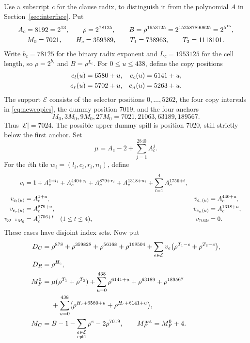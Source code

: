Use a subscript $c$ for the clause radix, to distinguish it from the
polynomial $A$ in Section~\ref{sec:interface}.  Put
\begin{gather}
 A_c=8192=2^{13},\qquad \rho=2^{78125},\qquad
 B=\rho^{1953125}=2^{152587890625}=2^{5^{16}},\label{eq:newbase}\\
 M_0=7021,\qquad H_c=359389,\qquad
 T_1=738963,\qquad T_2=1118101.\notag
\end{gather}
Write $b_c=78125$ for the binary radix exponent and $L_c=1953125$
for the cell length, so $\rho=2^{b_c}$ and $B=\rho^{L_c}$.
For $0\le u\le438$, define the copy positions
\begin{align}
 e_l(u)&=6580+u,& e_c(u)&=6141+u,\notag\\
 e_r(u)&=5702+u,& e_n(u)&=5263+u.\label{eq:newcopies}
\end{align}
The support $\mathcal E$ consists of the selector positions
$0,\ldots,5262$, the four copy intervals in \eqref{eq:newcopies}, the
dummy position 7019, and the four anchors
\[
 M_0,3M_0,9M_0,27M_0=7021,21063,63189,189567.
\]
Thus $|\mathcal E|=7024$.  The possible upper dummy spill is position
7020, still strictly below the first anchor.  Set
\begin{equation}
 \mu=A_c-2+\sum_{j=1}^{2840}A_c^j.\label{eq:newmu}
\end{equation}
For the $i$th tile $w_i=(l_i,c_i,r_i,n_i)$, define
\begin{align}
 v_i={}&1+A_c^{1+l_i}+A_c^{440+c_i}+A_c^{879+r_i}
       +A_c^{1318+n_i}+\sum_{t=1}^4 A_c^{1756+t},\notag\\
 v_{e_l(u)}={}&A_c^{1+u},&v_{e_c(u)}={}&A_c^{440+u},\notag\\
 v_{e_r(u)}={}&A_c^{879+u},&v_{e_n(u)}={}&A_c^{1318+u},\notag\\
 v_{3^{t-1}M_0}={}&A_c^{1756+t}\quad(1\le t\le4),&v_{7019}={}&0.
 \label{eq:newclauses}
\end{align}
These cases have disjoint index sets.  Now put
\begin{align}
 D_C={}&\rho^{878}+\rho^{359828}+\rho^{56168}+\rho^{168504}
       +\sum_{e\in\mathcal E}v_e
          \bigl(\rho^{T_1-e}+\rho^{T_2-e}\bigr),\notag\\
 D_R={}&\rho^{H_c},\notag\\
 M_F^0={}&\mu(\rho^{T_1}+\rho^{T_2})
       +\sum_{u=0}^{438}\rho^{6141+u}
       +\rho^{63189}+\rho^{189567}\notag\\
 &+\sum_{u=0}^{438}
       \bigl(\rho^{H_c+6580+u}+\rho^{H_c+6141+u}\bigr),\notag\\
 M_C={}&B-1-\sum_{\substack{e\in\mathcal E\\e\ne1}}\rho^e
             -2\rho^{7019},\qquad M_F^{\rm nat}=M_F^0+4.
 \label{eq:newmasks}
\end{align}
